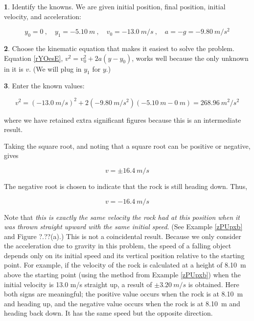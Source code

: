 \documentclass[../../main-ap-physics.tex]{subfiles}
\begin{document}
\vspace{1em}

\textbf{1}. Identify the knowns. We are given initial position, final position, initial velocity, and acceleration:

\begin{equation*}
    y_0 = 0\ , \quad
    y_1 = \SI{-5.10}{m}\ , \quad
    v_0 = \SI{-13.0}{m/s}\ , \quad
    a = -g = -\SI{9.80}{m/s^2}
\end{equation*}

\textbf{2}. Choose the kinematic equation that makes it easiest to solve the problem. Equation \eqref{rYOesE}, $v^2 = v_0^2 + 2 a (y - y_0)$, works well because the only unknown in it is $v$. (We will plug in $y_1$ for $y$.)

\vspace{1em}

\textbf{3}. Enter the known values:

\begin{equation*}
    v^2 = \left(\SI{-13.0}{m/s}\right)^2 + 2 \left(\SI{-9.80}{m/s^2}\right) \left(\SI{-5.10}{m} - \SI{0}{m}\right) = \SI{268.96}{m^2/s^2}
\end{equation*}

where we have retained extra significant figures because this is an intermediate result.

\vspace{1em}

Taking the square root, and noting that a square root can be positive or negative, gives

\begin{equation*}
    v = \pm \SI{16.4}{m/s}
\end{equation*}

The negative root is chosen to indicate that the rock is still heading down. Thus,

\begin{equation*}
    v = -\SI{16.4}{m/s}
\end{equation*}

Note that \textit{this is exactly the same velocity the rock had at this position when it was thrown straight upward with the same initial speed}. (See Example \ref{zPUpxb} and Figure ?.??(a).) This is not a coincidental result. Because we only consider the acceleration due to gravity in this problem, the speed of a falling object depends only on its initial speed and its vertical position relative to the starting point. For example, if the velocity of the rock is calculated at a height of \SI{8.10}{m} above the starting point (using the method from Example \ref{zPUpxb}) when the initial velocity is 13.0 m/s straight up, a result of $\pm \SI{3.20}{m/s}$ is obtained. Here both signs are meaningful; the positive value occurs when the rock is at \SI{8.10}{m} and heading up, and the negative value occurs when the rock is at \SI{8.10}{m} and heading back down. It has the same speed but the opposite direction.
\end{document}
